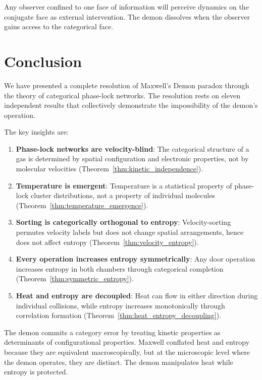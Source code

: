 Any observer confined to one face of information will perceive dynamics on the conjugate face as external intervention. The demon dissolves when the observer gains access to the categorical face.

\section{Conclusion}
\label{sec:conclusion}

We have presented a complete resolution of Maxwell's Demon paradox through the theory of categorical phase-lock networks. The resolution rests on eleven independent results that collectively demonstrate the impossibility of the demon's operation.

The key insights are:

\begin{enumerate}
\item \textbf{Phase-lock networks are velocity-blind}: The categorical structure of a gas is determined by spatial configuration and electronic properties, not by molecular velocities (Theorem~\ref{thm:kinetic_independence}).

\item \textbf{Temperature is emergent}: Temperature is a statistical property of phase-lock cluster distributions, not a property of individual molecules (Theorem~\ref{thm:temperature_emergence}).

\item \textbf{Sorting is categorically orthogonal to entropy}: Velocity-sorting permutes velocity labels but does not change spatial arrangements, hence does not affect entropy (Theorem~\ref{thm:velocity_entropy}).

\item \textbf{Every operation increases entropy symmetrically}: Any door operation increases entropy in both chambers through categorical completion (Theorem~\ref{thm:symmetric_entropy}).

\item \textbf{Heat and entropy are decoupled}: Heat can flow in either direction during individual collisions, while entropy increases monotonically through correlation formation (Theorem~\ref{thm:heat_entropy_decoupling}).
\end{enumerate}

The demon commits a category error by treating kinetic properties as determinants of configurational properties. Maxwell conflated heat and entropy because they are equivalent macroscopically, but at the microscopic level where the demon operates, they are distinct. The demon manipulates heat while entropy is protected.

